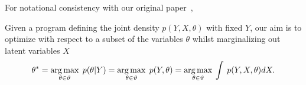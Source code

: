 For notational consistency with our original paper~\citep{rainforth2016nips}, 

Given a program defining the joint density $p(Y, X, \theta)$ with fixed $Y$, our aim is to optimize with respect to a subset of the variables $\theta$ whilst marginalizing out latent variables $X$
\begin{equation}
\label{eq:MMAP}
\theta^* = \operatorname*{arg\,max}_{\theta \in \vartheta} \; p(\theta | Y) = \operatorname*{arg\,max}_{\theta \in \vartheta} \; p(Y, \theta) = \operatorname*{arg\,max}_{\theta \in \vartheta} \: \int \: p(Y, X, \theta) dX.
\end{equation}

